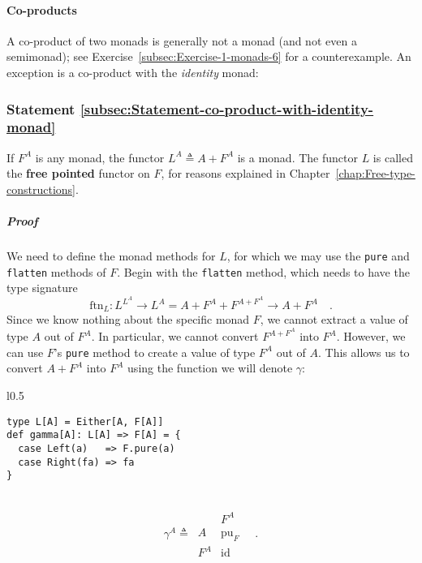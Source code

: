 \paragraph{Co-products}

A co-product of two monads is generally not a monad (and not even
a semimonad); see Exercise~\ref{subsec:Exercise-1-monads-6} for
a counterexample. An exception is a co-product with the \emph{identity}
monad:

\subsubsection{Statement \label{subsec:Statement-co-product-with-identity-monad}\ref{subsec:Statement-co-product-with-identity-monad}}

If $F^{A}$ is any monad, the functor $L^{A}\triangleq A+F^{A}$ is
a monad. The functor $L$ is called the \textbf{free pointed}
functor on $F$, for reasons explained in Chapter~\ref{chap:Free-type-constructions}.

\subparagraph{Proof}

We need to define the monad methods for $L$, for which we may use
the \lstinline!pure! and \lstinline!flatten! methods of $F$. Begin
with the \lstinline!flatten! method, which needs to have the type
signature
\[
\text{ftn}_{L}:L^{L^{A}}\rightarrow L^{A}=A+F^{A}+F^{A+F^{A}}\rightarrow A+F^{A}\quad.
\]
Since we know nothing about the specific monad $F$, we cannot extract
a value of type $A$ out of $F^{A}$. In particular, we cannot convert
$F^{A+F^{A}}$ into $F^{A}$. However, we can use $F$\textsf{'}s \lstinline!pure!
method to create a value of type $F^{A}$ out of $A$. This allows
us to convert $A+F^{A}$ into $F^{A}$ using the function we will
denote $\gamma$:

\begin{wrapfigure}{l}{0.5\columnwidth}%
\vspace{-0.8\baselineskip}
\begin{lstlisting}
type L[A] = Either[A, F[A]]
def gamma[A]: L[A] => F[A] = {
  case Left(a)   => F.pure(a)
  case Right(fa) => fa
}
\end{lstlisting}

\vspace{-2\baselineskip}
\end{wrapfigure}%

~\vspace{-0.2\baselineskip}
\[
\gamma^{A}\triangleq\,\begin{array}{|c||c|}
 & F^{A}\\
\hline A & \text{pu}_{F}\\
F^{A} & \text{id}
\end{array}\quad.
\]

